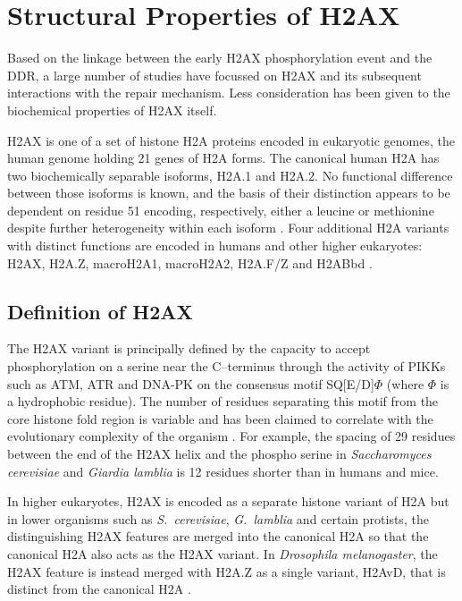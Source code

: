 \documentclass[graybox]{svmult}
\begin{document}
\section{Structural Properties of H2AX}
\label{sec:structure-properties}
Based on the linkage between the early H2AX phosphorylation event and the DDR, a large number of
studies have focussed on \ugamma H2AX and its subsequent interactions with the repair mechanism.
Less consideration has been given to the biochemical properties of H2AX itself.

H2AX is one of a set of histone H2A proteins encoded in eukaryotic genomes, the human genome holding
21 genes of H2A forms. The canonical human H2A has two biochemically separable isoforms, H2A.1 and
H2A.2. No functional difference between those isoforms is known, and the basis of their distinction
appears to be dependent on residue 51 encoding, respectively, either a leucine or methionine despite
further heterogeneity within each isoform \cite{DBMC+06,WFM+02}. Four additional H2A variants with
distinct functions are encoded in humans and other higher eukaryotes: H2AX, H2A.Z, macroH2A1,
macroH2A2, H2A.F/Z and H2ABbd \cite{WFM+02}.

\subsection{Definition of H2AX}
\label{subsec:relation-H2A-H2AX}
The H2AX variant is principally defined by the capacity to accept phosphorylation on a serine near
the C--terminus through the activity of PIKKs such as ATM, ATR and DNA-PK on the consensus motif
SQ[E/D]$\varPhi$ (where $\varPhi$ is a hydrophobic residue). The number of residues separating this
motif from the core histone fold region is variable and has been claimed to correlate with the
evolutionary complexity of the organism \cite{CRDP+02}. For example, the spacing of 29 residues
between the end of the H2AX  helix and the phospho serine in \emph{Saccharomyces cerevisiae}
and \emph{Giardia lamblia} is 12 residues shorter than in humans and mice.

In higher eukaryotes, H2AX is encoded as a separate histone variant of H2A but in lower organisms
such as \emph{S.\ cerevisiae}, \emph{G.\ lamblia} and certain protists, the distinguishing H2AX
features are merged into the canonical H2A \cite{HSM03,SJN06} so that the canonical H2A also acts as
the H2AX variant. In \emph{Drosophila melanogaster}, the H2AX feature is instead merged with H2A.Z
as a single variant, H2AvD, that is distinct from the canonical H2A \cite{MCG02}.
\end{document}
